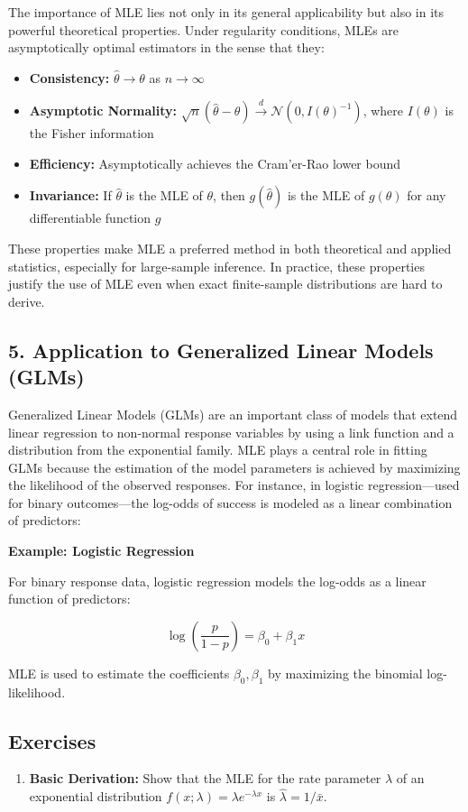 \documentclass{book}
\begin{document}
The importance of MLE lies not only in its general applicability but also in its powerful theoretical properties. 
Under regularity conditions, MLEs are asymptotically optimal estimators in the sense that they:
\begin{itemize}
\item \textbf{Consistency:} $\hat{\theta} \to \theta$ as $n \to \infty$
\item \textbf{Asymptotic Normality:} $\sqrt{n}(\hat{\theta} - \theta) \xrightarrow{d} \mathcal{N}(0, I(\theta)^{-1})$, where $I(\theta)$ is the Fisher information
\item \textbf{Efficiency:} Asymptotically achieves the Cram'er-Rao lower bound
\item \textbf{Invariance:} If $\hat{\theta}$ is the MLE of $\theta$, then $g(\hat{\theta})$ is the MLE of $g(\theta)$ for any differentiable function $g$
\end{itemize}
These properties make MLE a preferred method in both theoretical and applied statistics, especially for large-sample inference. 
In practice, these properties justify the use of MLE even when exact finite-sample distributions are hard to derive.

\subsection{5. Application to Generalized Linear Models (GLMs)}

Generalized Linear Models (GLMs) are an important class of models that extend linear regression to non-normal response variables by using a link function and a distribution from the exponential family. MLE plays a central role in fitting GLMs because the estimation of the model parameters is achieved by maximizing the likelihood of the observed responses.
For instance, in logistic regression---used for binary outcomes---the log-odds of success is modeled as a linear combination of predictors:

\textbf{Example: Logistic Regression}

For binary response data, logistic regression models the log-odds as a linear function of predictors:

\[
\log\left( \frac{p}{1 - p} \right) = \beta_0 + \beta_1 x
\]

MLE is used to estimate the coefficients $\beta_0, \beta_1$ by maximizing the binomial log-likelihood.

\subsection*{Exercises}
\begin{enumerate}
\item \textbf{Basic Derivation:} Show that the MLE for the rate parameter $\lambda$ of an exponential distribution $f(x; \lambda) = \lambda e^{-\lambda x}$ is $\hat{\lambda} = 1 / \bar{x}$.
\end{enumerate}
\end{document}
